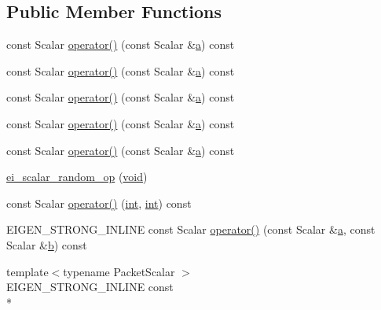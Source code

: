 \subsection*{Public Member Functions}
\begin{DoxyCompactItemize}
\item 
const Scalar \hyperlink{struct_e_i_g_e_n___e_m_p_t_y___s_t_r_u_c_t_a5f2490a55f92427f43d61f581235f79f}{operator()} (const Scalar \&\hyperlink{glext_8h_ac8729153468b5dcf13f971b21d84d4e5}{a}) const 
\item 
const Scalar \hyperlink{struct_e_i_g_e_n___e_m_p_t_y___s_t_r_u_c_t_a5f2490a55f92427f43d61f581235f79f}{operator()} (const Scalar \&\hyperlink{glext_8h_ac8729153468b5dcf13f971b21d84d4e5}{a}) const 
\item 
const Scalar \hyperlink{struct_e_i_g_e_n___e_m_p_t_y___s_t_r_u_c_t_a5f2490a55f92427f43d61f581235f79f}{operator()} (const Scalar \&\hyperlink{glext_8h_ac8729153468b5dcf13f971b21d84d4e5}{a}) const 
\item 
const Scalar \hyperlink{struct_e_i_g_e_n___e_m_p_t_y___s_t_r_u_c_t_a5f2490a55f92427f43d61f581235f79f}{operator()} (const Scalar \&\hyperlink{glext_8h_ac8729153468b5dcf13f971b21d84d4e5}{a}) const 
\item 
const Scalar \hyperlink{struct_e_i_g_e_n___e_m_p_t_y___s_t_r_u_c_t_a5f2490a55f92427f43d61f581235f79f}{operator()} (const Scalar \&\hyperlink{glext_8h_ac8729153468b5dcf13f971b21d84d4e5}{a}) const 
\item 
\hyperlink{struct_e_i_g_e_n___e_m_p_t_y___s_t_r_u_c_t_a2d105bb0b233123c1d184b5a78555c15}{ei\-\_\-scalar\-\_\-random\-\_\-op} (\hyperlink{group___u_a_v_objects_plugin_ga444cf2ff3f0ecbe028adce838d373f5c}{void})
\item 
const Scalar \hyperlink{struct_e_i_g_e_n___e_m_p_t_y___s_t_r_u_c_t_a4f94537ae4a24df553a952a4ef396312}{operator()} (\hyperlink{ioapi_8h_a787fa3cf048117ba7123753c1e74fcd6}{int}, \hyperlink{ioapi_8h_a787fa3cf048117ba7123753c1e74fcd6}{int}) const 
\item 
E\-I\-G\-E\-N\-\_\-\-S\-T\-R\-O\-N\-G\-\_\-\-I\-N\-L\-I\-N\-E const Scalar \hyperlink{struct_e_i_g_e_n___e_m_p_t_y___s_t_r_u_c_t_a9800a6fef6baf202e8d4d1075d615149}{operator()} (const Scalar \&\hyperlink{glext_8h_ac8729153468b5dcf13f971b21d84d4e5}{a}, const Scalar \&\hyperlink{glext_8h_a6eba317e3cf44d6d26c04a5a8f197dcb}{b}) const 
\item 
{\footnotesize template$<$typename Packet\-Scalar $>$ }\\E\-I\-G\-E\-N\-\_\-\-S\-T\-R\-O\-N\-G\-\_\-\-I\-N\-L\-I\-N\-E const \\*

\end{DoxyCompactItemize}
